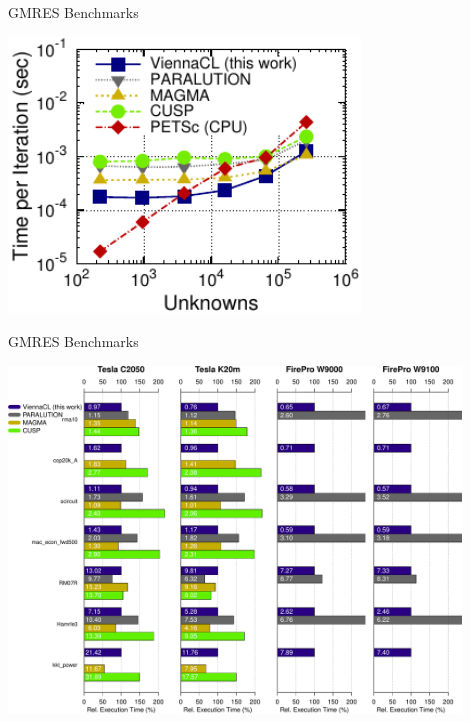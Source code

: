 \begin{frame}[fragile]{GMRES Benchmarks}
 \begin{block}{}
 \begin{center}
  \includegraphics[width=0.7\textwidth]{figures/time-laplace2d-K20m-gmres}
 \end{center}
 \end{block}   
\end{frame}

\begin{frame}[fragile]{GMRES Benchmarks}
 \begin{block}{}
 \begin{center}
  \vspace*{-1cm}
  \includegraphics[width=0.9\textwidth]{figures/gmres}
 \end{center}
 \end{block}   
\end{frame}

